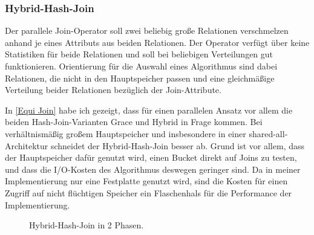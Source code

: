\documentclass[a4paper,12pt,twoside]{article}
\begin{document}
\subsubsection{Hybrid-Hash-Join}
\label{entw:hash}

Der parallele Join-Operator soll zwei beliebig große Relationen verschmelzen anhand je eines Attributs aus beiden Relationen. Der Operator verfügt über keine Statistiken für beide Relationen und soll bei beliebigen Verteilungen gut funktionieren. Orientierung für die Auswahl eines Algorithmus sind dabei Relationen, die nicht in den Hauptspeicher passen und eine gleichmäßige Verteilung beider Relationen bezüglich der Join-Attribute.

In \autoref{Equi Join} habe ich gezeigt, dass für einen parallelen Ansatz vor allem die beiden Hash-Join-Varianten Grace und Hybrid in Frage kommen. Bei verhältnismäßig großem Hauptspeicher und insbesondere in einer shared-all-Architektur schneidet der Hybrid-Hash-Join besser ab. Grund ist vor allem, dass der Hauptspeicher dafür genutzt wird, einen Bucket direkt auf Joins zu testen, und dass die I/O-Kosten des Algorithmus deswegen geringer sind. Da in meiner Implementierung nur eine Festplatte genutzt wird, sind die Kosten für einen Zugriff auf nicht flüchtigen Speicher ein Flaschenhals für die Performance der Implementierung.

\begin{figure}
	\centering
	\qquad
	\footnotemark	
	\caption{Hybrid-Hash-Join in 2 Phasen.}
	\label{img:hybrid}
\end{figure}

\end{document}
